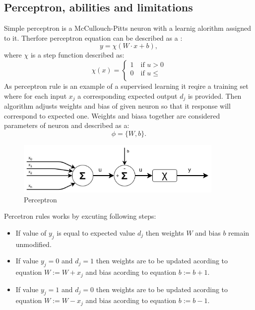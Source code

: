 \subsection{Perceptron, abilities and limitations}
Simple perceptron is a McCullouch-Pitts neuron with a learnig alorithm assigned to it.
Therfore perceptron equation can be described as a :
\begin{equation}
	y = \chi (W\cdot x+b),
\end{equation}
where $\chi$ is a step function described as:
\begin{equation}
	\chi (x) =  
	\begin{cases}
		1        \quad \text{if } u > 0\\
		0        \quad \text{if } u \leq \\
	\end{cases}
\end{equation}
As perceptron rule is an example of a supervised learning it reqire a training set where for 
each input $x_{j}$ a corresponding expected output $d_{j}$ is provided. 
Then algorithm adjusts weights and bias of given neuron so that it response will 
correspond to expected one. 
Weights and biasa together are considered parameters of neuron and described as a:
\begin{equation}
	\phi = \{ W,b \}.
\end{equation}
\begin{figure}[ht] 
	\centering
	\includegraphics[width=10cm]{res/perceptron}
	\caption{Perceptron}
	\label{fig:perceptron}
\end{figure}
Percetron rules works by excuting following steps:
\begin{itemize}
	\item If value of $y_{j}$ is equal to expected value $d_{j}$ then weights $W$ and 
		  bias $b$ remain unmodified.
	\item If value $y_{j}=0$ and $d_{j}=1$ then weights are to be updated acording to 
		  equation $W:=W+x_{j}$ and bias acording to equation $b:=b+1$.
	\item If value $y_{j}=1$ and $d_{j}=0$ then weights are to be updated acording to 
		  equation $W:=W-x_{j}$ and bias acording to equation $b:=b-1$.
\end{itemize}
